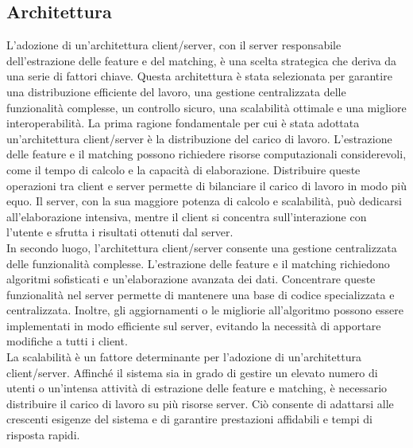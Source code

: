 \documentclass[a4paper,12pt]{report}
\begin{document}
    \subsection{Architettura}

    L'adozione di un'architettura client/server, con il server responsabile dell'estrazione delle feature e del matching, è una scelta strategica che deriva da una serie di fattori chiave. Questa architettura è stata selezionata per garantire una distribuzione efficiente del lavoro, una gestione centralizzata delle funzionalità complesse, un controllo sicuro, una scalabilità ottimale e una migliore interoperabilità.
    La prima ragione fondamentale per cui è stata adottata un'architettura client/server è la distribuzione del carico di lavoro. L'estrazione delle feature e il matching possono richiedere risorse computazionali considerevoli, come il tempo di calcolo e la capacità di elaborazione. Distribuire queste operazioni tra client e server permette di bilanciare il carico di lavoro in modo più equo. Il server, con la sua maggiore potenza di calcolo e scalabilità, può dedicarsi all'elaborazione intensiva, mentre il client si concentra sull'interazione con l'utente e sfrutta i risultati ottenuti dal server.
    \\
    In secondo luogo, l'architettura client/server consente una gestione centralizzata delle funzionalità complesse. L'estrazione delle feature e il matching richiedono algoritmi sofisticati e un'elaborazione avanzata dei dati. Concentrare queste funzionalità nel server permette di mantenere una base di codice specializzata e centralizzata. Inoltre, gli aggiornamenti o le migliorie all'algoritmo possono essere implementati in modo efficiente sul server, evitando la necessità di apportare modifiche a tutti i client.
    \\
    La scalabilità è un fattore determinante per l'adozione di un'architettura client/server. Affinché il sistema sia in grado di gestire un elevato numero di utenti o un'intensa attività di estrazione delle feature e matching, è necessario distribuire il carico di lavoro su più risorse server. Ciò consente di adattarsi alle crescenti esigenze del sistema e di garantire prestazioni affidabili e tempi di risposta rapidi.
\end{document}
